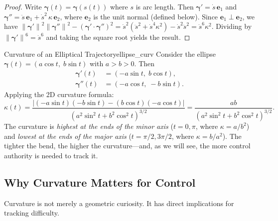\documentclass[12pt, openany]{book}
\theoremstyle{plain}
\newcommand{\traj}{\bm{\gamma}}
\newcommand{\norm}[1]{\left\lVert #1 \right\rVert}
\newcommand{\tangent}{\bm{e}_1}
\newcommand{\normal}{\bm{e}_2}
\begin{document}
\begin{proof}
  Write $\traj(t) = \traj(s(t))$ where $s$ is arc length. Then
  $\traj' = \dot{s}\, \tangent$ and
  $\traj'' = \ddot{s}\, \tangent + \dot{s}^2\, \kappa\, \normal$,
  where $\normal$ is the unit normal (defined below). Since
  $\tangent \perp \normal$, we have
  $\norm{\traj'}^2\norm{\traj''}^2 - (\traj'\cdot\traj'')^2
  = \dot{s}^2(\ddot{s}^2 + \dot{s}^4\kappa^2) - \dot{s}^2\ddot{s}^2
  = \dot{s}^6\kappa^2$.
  Dividing by $\norm{\traj'}^6 = \dot{s}^6$ and taking the square root yields
  the result.
\end{proof}

\begin{example}{Curvature of an Elliptical Trajectory}{ellipse_curv}
  Consider the ellipse $\traj(t) = (a\cos t,\; b\sin t)$ with $a > b > 0$. Then
  \begin{align}
    \traj'(t) &= (-a\sin t,\; b\cos t), \\
    \traj''(t) &= (-a\cos t,\; -b\sin t).
  \end{align}
  Applying the 2D curvature formula:
  \begin{equation}
    \kappa(t) = \frac{|(-a\sin t)(-b\sin t) - (b\cos t)(-a\cos t)|}
    {(a^2\sin^2 t + b^2\cos^2 t)^{3/2}}
    = \frac{ab}{(a^2\sin^2 t + b^2\cos^2 t)^{3/2}}.
  \end{equation}
  The curvature is \emph{highest at the ends of the minor axis}
  ($t = 0, \pi$, where $\kappa = a/b^2$) and \emph{lowest at the ends of the
  major axis} ($t = \pi/2, 3\pi/2$, where $\kappa = b/a^2$). The tighter the
  bend, the higher the curvature---and, as we will see, the more control
  authority is needed to track it.
\end{example}

\subsection{Why Curvature Matters for Control}

Curvature is not merely a geometric curiosity. It has direct implications for
tracking difficulty.
\end{document}
